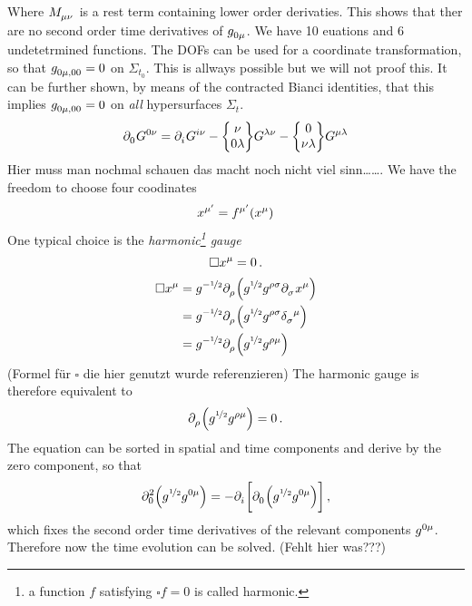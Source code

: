 Where $\tensor{M}{_\mu_\nu}$ is a rest term containing lower order derivaties.
This shows that ther are no second order time derivatives of
$\tensor{g}{_0_\mu}$. We have 10 euations and 6 undetetrmined functions. The
DOFs can be used for a coordinate transformation, so that
$\tensor{g}{_0_\mu_{,00}}=0$ on $\Sigma_{t_0}$. This is allways possible but we
will not proof this. It can be further shown, by means of the contracted Bianci
identities, that this implies $\tensor{g}{_0_\mu_{,00}}=0$ on \emph{all}
hypersurfaces $\Sigma_{t}$.
\begin{equation}
\tensor{\partial}{_0}\tensor{G}{^0^\nu}=
\tensor{\partial}{_i}\tensor{G}{^i^\nu}
-\cSym{\nu}{0}{\lambda}\tensor{G}{^\lambda^\nu}
-\cSym{0}{\nu}{\lambda}\tensor{G}{^\mu^\lambda}
\end{equation}
Hier muss man nochmal schauen das macht noch nicht viel sinn\ldots\ldots.
We have the freedom to choose four coodinates
\begin{equation}
\tensor{x}{^{\mu^\prime}}=\tensor{f}{^{\mu^\prime}}\left(\tensor{x}{^\mu}\right)
\end{equation}
One typical choice is the \emph{harmonic\footnote{a function $f$ satisfying
$\square f = 0$ is called harmonic.} gauge}
\begin{equation}
\square\tensor{x}{^\mu}=0\,.
\end{equation}
\begin{equation}
\begin{split}
\square\tensor{x}{^\mu}&=g^{-\nicefrac{1}{2}}\tensor{\partial}{_\rho}\left(g^{\nicefrac{1}{2}}\tensor{g}{^\rho^\sigma}\tensor{\partial}{_\sigma}\tensor{x}{^\mu}\right)\\
&=g^{-\nicefrac{1}{2}}\tensor{\partial}{_\rho}\left(g^{\nicefrac{1}{2}}\tensor{g}{^\rho^\sigma}\tensor{\delta}{_\sigma^\mu}\right)\\
&=g^{-\nicefrac{1}{2}}\tensor{\partial}{_\rho}\left(g^{\nicefrac{1}{2}}\tensor{g}{^\rho^\mu}\right)\\
\end{split}
\end{equation}
(Formel für $\square$ die hier genutzt wurde referenzieren)
The harmonic gauge is therefore equivalent to
\begin{equation}
\tensor{\partial}{_\rho}\left(g^{\nicefrac{1}{2}}\tensor{g}{^\rho^\mu}\right)=0\,
.\\
\end{equation}
The equation can be sorted in spatial and time components and derive by the
zero component, so that
\begin{equation}
\tensor*{\partial}{*_0^2}\left(g^{\nicefrac{1}{2}}\tensor{g}{^0^\mu}\right)
=
-\tensor{\partial}{_i}\left[\tensor{\partial}{_0}\left(g^{\nicefrac{1}{2}}\tensor{g}{^0^\mu}\right)\right]\,
,\end{equation}
which fixes the second order time derivatives of the relevant components
$\tensor{g}{^0^\mu}$. Therefore now the time evolution can be solved. (Fehlt
hier was???)
